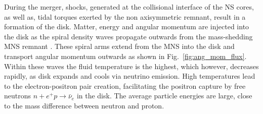 During the merger, shocks, generated at the collisional interface of the \ac{NS} cores,
as well as, tidal torques exerted by the non axisymmetric remnant, result in a formation
of the disk. Matter, energy and angular momentum are injected into the disk as the spiral 
density waves propagate outwards from the mass-shedding \ac{MNS} remnant 
\citep{Bernuzzi:2015opx,Radice:2018xqa}.
%
These spiral arms extend from the \ac{MNS} into the disk and transport angular 
momentum outwards as shown in Fig.~\ref{fig:ang_mom_flux}. %
%
Within these waves the fluid temperature is the highest, which however, decreases rapidly, as 
disk expands and cools via neutrino emission.
High temperatures lead to the electron-positron pair creation, 
facilitating the positron capture by free neutrons $n+e^+p\rightarrow\bar{\nu}_e$ in the disk.
%
The average particle energies are large, close to the mass difference between neutron 
and proton. 
